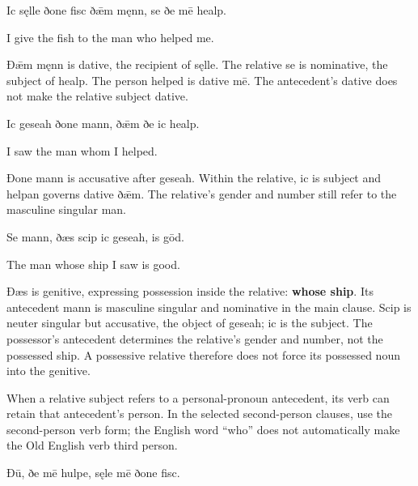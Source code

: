 Ic sęlle ðone fisc ðǣm męnn, se ðe mē healp.

I give the fish to the man who helped me.

Ðǣm męnn is dative, the recipient of sęlle. The relative se is nominative, the subject of healp. The person helped is dative mē. The antecedent’s dative does not make the relative subject dative.

Ic geseah ðone mann, ðǣm ðe ic healp.

I saw the man whom I helped.

Ðone mann is accusative after geseah. Within the relative, ic is subject and helpan governs dative ðǣm. The relative’s gender and number still refer to the masculine singular man.

Se mann, ðæs scip ic geseah, is gōd.

The man whose ship I saw is good.

Ðæs is genitive, expressing possession inside the relative: \textbf{whose ship}. Its antecedent mann is masculine singular and nominative in the main clause. Scip is neuter singular but accusative, the object of geseah; ic is the subject. The possessor’s antecedent determines the relative’s gender and number, not the possessed ship. A possessive relative therefore does not force its possessed noun into the genitive.

When a relative subject refers to a personal-pronoun antecedent, its verb can retain that antecedent’s person. In the selected second-person clauses, use the second-person verb form; the English word “who” does not automatically make the Old English verb third person.

Ðū, ðe mē hulpe, sęle mē ðone fisc.

